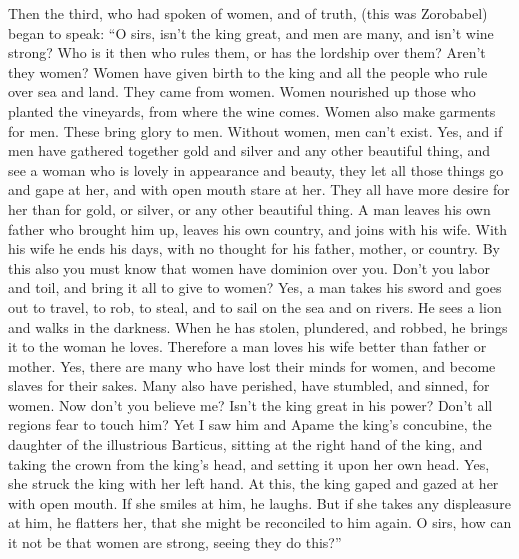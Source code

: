  Then the third, who had spoken of women, and of truth,
(this was Zorobabel) began to speak:  ``O sirs, isn't the
king great, and men are many, and isn't wine strong? Who is it then who
rules them, or has the lordship over them? Aren't they women?
 Women have given birth to the king and all the people who
rule over sea and land.  They came from women. Women
nourished up those who planted the vineyards, from where the wine comes.
 Women also make garments for men. These bring glory to
men. Without women, men can't exist.  Yes, and if men have
gathered together gold and silver and any other beautiful thing, and see
a woman who is lovely in appearance and beauty,  they let
all those things go and gape at her, and with open mouth stare at her.
They all have more desire for her than for gold, or silver, or any other
beautiful thing.  A man leaves his own father who brought
him up, leaves his own country, and joins with his wife. 
With his wife he ends his days, with no thought for his father, mother,
or country.  By this also you must know that women have
dominion over you. Don't you labor and toil, and bring it all to give to
women?  Yes, a man takes his sword and goes out to travel,
to rob, to steal, and to sail on the sea and on rivers.  He
sees a lion and walks in the darkness. When he has stolen, plundered,
and robbed, he brings it to the woman he loves.  Therefore
a man loves his wife better than father or mother.  Yes,
there are many who have lost their minds for women, and become slaves
for their sakes.  Many also have perished, have stumbled,
and sinned, for women.  Now don't you believe me? Isn't the
king great in his power? Don't all regions fear to touch him?
 Yet I saw him and Apame the king's concubine, the daughter
of the illustrious Barticus, sitting at the right hand of the king,
 and taking the crown from the king's head, and setting it
upon her own head. Yes, she struck the king with her left hand.
 At this, the king gaped and gazed at her with open mouth.
If she smiles at him, he laughs. But if she takes any displeasure at
him, he flatters her, that she might be reconciled to him again.
 O sirs, how can it not be that women are strong, seeing
they do this?''

